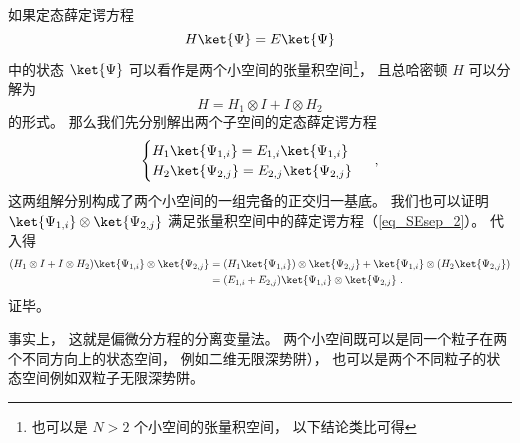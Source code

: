 
如果定态薛定谔方程
\begin{equation}\label{eq_SEsep_2}
H \ket{\Psi} = E \ket{\Psi}
\end{equation}
中的状态 $\ket{\Psi}$ 可以看作是两个小空间的张量积空间\footnote{也可以是 $N > 2$ 个小空间的张量积空间， 以下结论类比可得}， 且总哈密顿 $H$ 可以分解为
\begin{equation}\label{eq_SEsep_1}
H = H_1 \otimes I + I \otimes H_2
\end{equation}
的形式。 那么我们先分别解出两个子空间的定态薛定谔方程
\begin{equation}
\begin{cases}
H_1 \ket{\Psi_{1,i}} = E_{1,i} \ket{\Psi_{1,i}}\\
H_2 \ket{\Psi_{2,j}} = E_{2,j} \ket{\Psi_{2,j}}
\end{cases}~,
\end{equation}
这两组解分别构成了两个小空间的一组完备的正交归一基底。 我们也可以证明 $\ket{\Psi_{1,i}} \otimes \ket{\Psi_{2,j}}$ 满足张量积空间中的薛定谔方程（\autoref{eq_SEsep_2}）。 代入得
\begin{equation}
\begin{aligned}
(H_1 \otimes I + I \otimes H_2) \ket{\Psi_{1,i}} \otimes \ket{\Psi_{2,j}} &= (H_1 \ket{\Psi_{1,i}}) \otimes \ket{\Psi_{2,j}} +  \ket{\Psi_{1,i}} \otimes (H_2 \ket{\Psi_{2,j}})\\
&= (E_{1,i} + E_{2, j}) \ket{\Psi_{1,i}} \otimes \ket{\Psi_{2,j}}~.
\end{aligned}
\end{equation}
证毕。

事实上， 这就是偏微分方程的分离变量法。 两个小空间既可以是同一个粒子在两个不同方向上的状态空间， 例如二维无限深势阱）， 也可以是两个不同粒子的状态空间例如双粒子无限深势阱。%
